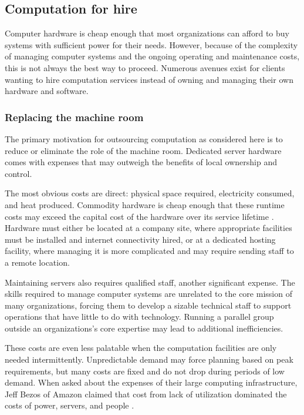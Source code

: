 \subsection{Computation for hire}

Computer hardware is cheap enough that most organizations can afford to buy systems with sufficient power for their needs. However, because of the complexity of managing computer systems and the ongoing operating and maintenance costs, this is not always the best way to proceed. Numerous avenues exist for clients wanting to hire computation services instead of owning and managing their own hardware and software.

\subsubsection{Replacing the machine room}

The primary motivation for outsourcing computation as considered here is to reduce or eliminate the role of the machine room. Dedicated server hardware comes with expenses that may outweigh the benefits of local ownership and control.

The most obvious costs are direct: physical space required, electricity consumed, and heat produced. Commodity hardware is cheap enough that these runtime costs may exceed the capital cost of the hardware over its service lifetime \cite{barroso05}. Hardware must either be located at a company site, where appropriate facilities must be installed and internet connectivity hired, or at a dedicated hosting facility, where managing it is more complicated and may require sending staff to a remote location.

Maintaining servers also requires qualified staff, another significant expense. The skills required to manage computer systems are unrelated to the core mission of many organizations, forcing them to develop a sizable technical staff to support operations that have little to do with technology. Running a parallel group outside an organizations's core expertise may lead to additional inefficiencies.

These costs are even less palatable when the computation facilities are only needed intermittently. Unpredictable demand may force planning based on peak requirements, but many costs are fixed and do not drop during periods of low demand. When asked about the expenses of their large computing infrastructure, Jeff Bezos of Amazon claimed that cost from lack of utilization dominated the costs of power, servers, and people \cite{bezos}.

